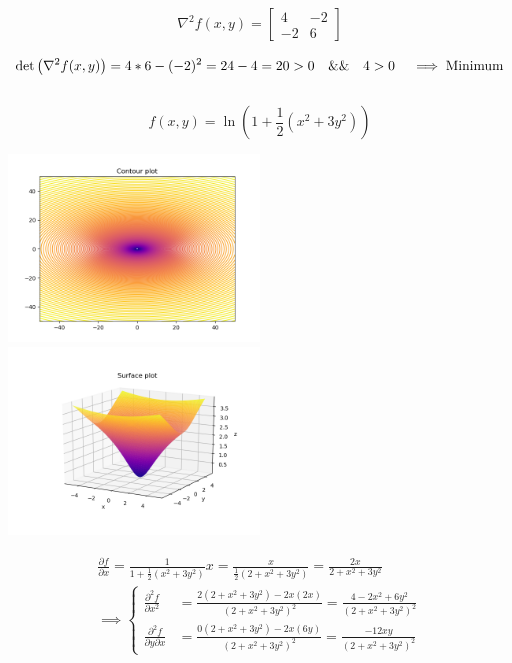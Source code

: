 \documentclass[12pt]{article}         %
\begin{document}
\begin{gather}
\nabla^2 f(x,y) = 
  \begin{bmatrix}
   4 &
   -2\\
   -2 &
   6 
   \end{bmatrix}
   \nonumber
\end{gather}

$$
\det\left(\nabla^2 f(x,y)\right) = 4*6-(-2)^2=24-4=20 >0  \quad \&\& \quad 4 > 0 \quad\implies \text{Minimum}\\ %
$$\\


\begin{equation}
	f(x,y) = \ln(1 + \dfrac{1}{2}(x^2 +3y^2))
\end{equation}

\includegraphics[width=0.5\textwidth]{Figure_4}
\includegraphics[width=0.5\textwidth]{Surface_4}

$$
\begin{aligned}
\frac {\partial f}{\partial x} = \frac{1}{1+\frac{1}{2}(x^2+3y^2)}x= \frac{x}{\frac{1}{2}(2+x^2+3y^2)}=\frac{2x}{2+x^2+3y^2}\\
\implies 
	\left\{
	\begin{aligned}
		\frac {\partial^2 f}{\partial x^2}&=\frac{2(2+x^2+3y^2)-2x(2x)}{(2+x^2+3y^2)^2}=
		 	\frac{4-2x^2+6y^2}{(2+x^2+3y^2)^2} \\
		\frac {\partial^2 f}{\partial y \partial x}&=\frac{0(2+x^2+3y^2)-2x(6y)}{(2+x^2+3y^2)^2}=
		 	\frac{-12xy}{(2+x^2+3y^2)^2} 
	 \end{aligned} 
	 \right.
\end{aligned}
$$
\end{document}
